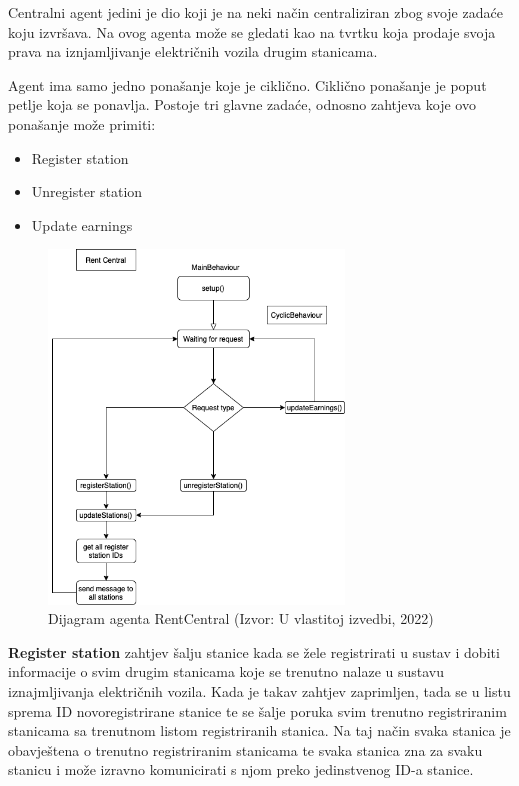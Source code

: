 \documentclass{foi}
\begin{document}
Centralni agent jedini je dio koji je na neki način centraliziran zbog svoje zadaće koju izvršava. Na ovog agenta može se gledati kao na tvrtku koja prodaje svoja prava na iznjamljivanje električnih vozila drugim stanicama. 

Agent ima samo jedno ponašanje koje je ciklično. Ciklično ponašanje je poput petlje koja se ponavlja. Postoje tri glavne zadaće, odnosno zahtjeva koje ovo ponašanje može primiti:
\begin{itemize}
	\item Register station
	\item Unregister station
	\item Update earnings
\end{itemize}

\begin{figure}[h!]
	\centering
	\includegraphics[width=0.7\textwidth]{slike/rentCentralSheme.png}
	\caption{Dijagram agenta RentCentral (Izvor: U vlastitoj izvedbi, 2022)}
\end{figure}

\textbf{Register station} zahtjev šalju stanice kada se žele registrirati u sustav i dobiti informacije o svim drugim stanicama koje se trenutno nalaze u sustavu iznajmljivanja električnih vozila. Kada je takav zahtjev zaprimljen, tada se u listu sprema ID novoregistrirane stanice te se šalje poruka svim trenutno registriranim stanicama sa trenutnom listom registriranih stanica. Na taj način svaka stanica je obavještena o trenutno registriranim stanicama te svaka stanica zna za svaku stanicu i može izravno komunicirati s njom preko jedinstvenog ID-a stanice.
\end{document}
